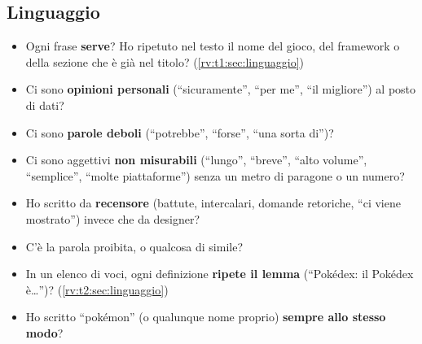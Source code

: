 \subsection{Linguaggio}
\begin{itemize}
  \item Ogni frase \textbf{serve}? Ho ripetuto nel testo il nome del gioco,
        del framework o della sezione che è già nel titolo?
        (\ref{rv:t1:sec:linguaggio})
  \item Ci sono \textbf{opinioni personali} (``sicuramente'', ``per me'',
        ``il migliore'') al posto di dati?
  \item Ci sono \textbf{parole deboli} (``potrebbe'', ``forse'', ``una sorta
        di'')?
  \item Ci sono aggettivi \textbf{non misurabili} (``lungo'', ``breve'',
        ``alto volume'', ``semplice'', ``molte piattaforme'') senza un metro
        di paragone o un numero?
  \item Ho scritto da \textbf{recensore} (battute, intercalari, domande
        retoriche, ``ci viene mostrato'') invece che da designer?
  \item C'è la parola proibita, o qualcosa di simile?
  \item In un elenco di voci, ogni definizione \textbf{ripete il lemma}
        (``Pokédex: il Pokédex è\dots'')? (\ref{rv:t2:sec:linguaggio})
  \item Ho scritto ``pokémon'' (o qualunque nome proprio) \textbf{sempre
        allo stesso modo}?
\end{itemize}

